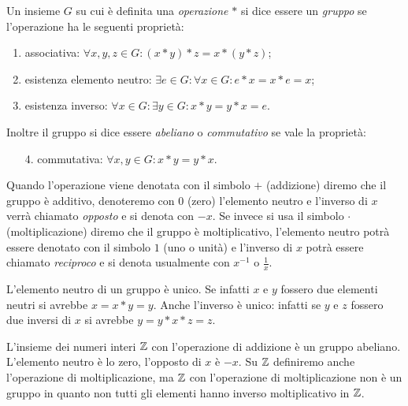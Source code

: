   \begin{definition}[gruppo]
  \label{def:gruppo}%
  Un insieme $G$ su cui è definita una \emph{operazione} $*$ 
  si dice essere un \emph{gruppo}%
%
 se l'operazione
  ha le seguenti proprietà:
  \begin{enumerate}
    \item associativa: $\forall x,y,z\in G\colon (x*y)*z = x*(y*z)$;
    \item esistenza elemento neutro: 
    $\exists e\in G\colon \forall x\in G \colon e*x=x*e = x$;
    \item esistenza inverso: 
    $\forall x\in G\colon \exists y\in G\colon x*y=y*x=e$.
  \end{enumerate}
  Inoltre il gruppo si dice essere \emph{abeliano}%
%
 o \emph{commutativo}
  se vale la proprietà:
  \begin{enumerate}
    \item[4.] commutativa: $\forall x,y\in G\colon x*y = y*x$.
  \end{enumerate}
  
  Quando l'operazione viene denotata con il simbolo $+$ (addizione)
  diremo che il gruppo è additivo, denoteremo con $0$ 
  (zero) l'elemento neutro e l'inverso di $x$ verrà chiamato \emph{opposto}
  e si denota con $-x$.
  Se invece si usa il simbolo $\cdot$ (moltiplicazione)
  diremo che il gruppo è moltiplicativo, l'elemento neutro potrà 
  essere denotato con il simbolo $1$ (uno o unità) e 
  l'inverso di $x$ potrà essere chiamato \emph{reciproco}
  e si denota usualmente con $x^{-1}$ o $\frac 1 x$.
\end{definition}
  
L'elemento neutro di un gruppo è unico. 
Se infatti $x$ e $y$ fossero due elementi neutri 
si avrebbe $x = x*y = y$. 
Anche l'inverso è unico: infatti se $y$ e $z$ fossero 
due inversi di $x$ si avrebbe $y = y * x * z = z$.

\begin{example}
  L'insieme dei numeri interi ${\mathbb Z}$ con l'operazione di addizione 
  è un gruppo abeliano. 
  L'elemento neutro è lo zero, l'opposto di $x$ è $-x$.
  Su ${\mathbb Z}$ definiremo anche l'operazione di moltiplicazione,
  ma ${\mathbb Z}$ con l'operazione di moltiplicazione non è un gruppo 
  in quanto non tutti gli elementi hanno inverso moltiplicativo in ${\mathbb Z}$.
\end{example}


